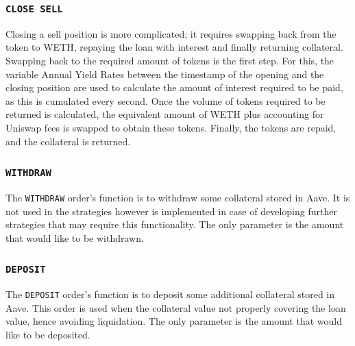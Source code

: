 \subsubsection{\texttt{CLOSE\ SELL}}
Closing a sell position is more complicated; it requires swapping back from the token to WETH, repaying the loan with interest and finally returning collateral. Swapping back to the required amount of tokens is the first step. For this, the variable Annual Yield Rates between the timestamp of the opening and the closing position are used to calculate the amount of interest required to be paid, as this is cumulated every second. Once the volume of tokens required to be returned is calculated, the equivalent amount of WETH plus accounting for Uniswap fees is swapped to obtain these tokens. Finally, the tokens are repaid, and the collateral is returned.

\subsubsection{\texttt{WITHDRAW}}
The \texttt{WITHDRAW} order's function is to withdraw some collateral stored in Aave. It is not used in the strategies however is implemented in case of developing further strategies that may require this functionality. The only parameter is the amount that would like to be withdrawn.

\subsubsection{\texttt{DEPOSIT}}
The \texttt{DEPOSIT} order's function is to deposit some additional collateral stored in Aave. This order is used when the collateral value not properly covering the loan value, hence avoiding liquidation. The only parameter is the amount that would like to be deposited. 

